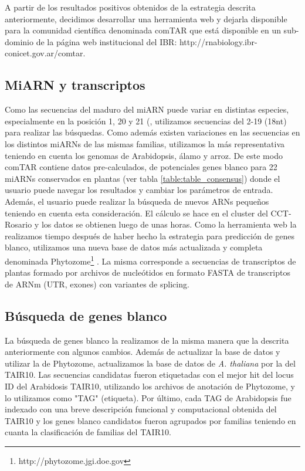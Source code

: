 A partir de los resultados positivos obtenidos de la estrategia descrita anteriormente, decidimos desarrollar una herramienta web y dejarla disponible para la comunidad científica denominada comTAR que está disponible en un sub-dominio de la página web institucional del IBR: http://rnabiology.ibr-conicet.gov.ar/comtar.

\subsection{MiARN y transcriptos}
Como las secuencias del maduro del miARN puede variar en distintas especies, especialmente en la posición 1, 20 y 21 (\citep{Chorostecki05072012}, utilizamos secuencias del 2-19 (18nt) para realizar las búsquedas.
Como además existen variaciones en las secuencias en los distintos miARNs de las mismas familias, utilizamos la más representativa teniendo en cuenta los genomas de Arabidopsis, álamo y arroz. 
De este modo comTAR contiene datos pre-calculados, de potenciales genes blanco para 22 miARNs conservados en plantas (ver tabla \ref{table:table_consensus}) donde el usuario puede navegar los resultados y cambiar los parámetros de entrada.
Además, el usuario puede realizar la búsqueda de nuevos ARNs pequeños teniendo en cuenta esta consideración. El cálculo se hace en el cluster del CCT-Rosario y los datos se obtienen luego de unas horas.
Como la herramienta web la realizamos tiempo después de haber hecho la estrategia para predicción de genes blanco, utilizamos una nueva base de datos más actualizada y completa denominada Phytozome\footnote{http://phytozome.jgi.doe.gov} \citep{Goodstein2012}. 
La misma corresponde a secuencias de transcriptos de plantas formado por archivos de nucleótidos en formato FASTA de transcriptos de ARNm (UTR, exones) con variantes de splicing.

\subsection{Búsqueda de genes blanco}
La búsqueda de genes blanco la realizamos de la misma manera que la descrita anteriormente con algunos cambios.
Además de actualizar la base de datos y utilizar la de Phytozome, actualizamos la base de datos de \textit{A. thaliana} por la del TAIR10.
Las secuencias candidatas fueron etiquetadas con el mejor hit del locus ID del Arabidosis TAIR10, utilizando los archivos de anotación de Phytozome, y lo utilizamos como "TAG" (etiqueta).
Por último, cada TAG de Arabidopsis fue indexado con una breve descripción funcional y computacional obtenida del TAIR10 y los genes blanco candidatos fueron agrupados por familias teniendo en cuanta la clasificación de familias del TAIR10.

